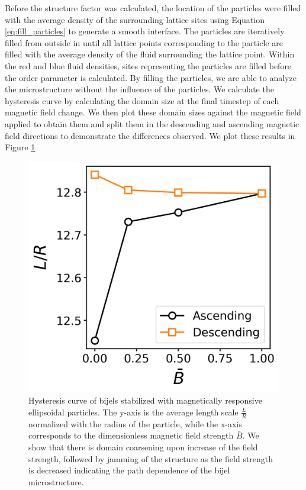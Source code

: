 Before the structure factor was calculated, the location of the particles were filled with the average density of the 
surrounding lattice sites using Equation \ref{eq:fill_particles} to generate a smooth interface. The particles are 
iteratively filled from outside in until all lattice points corresponding to the particle are filled with the average 
density of the fluid surrounding the lattice point. Within the red and blue fluid densities, sites representing the 
particles are filled before the order parameter is calculated. By filling the particles, we are able to analyze the 
microstructure without the influence of the particles. We calculate the hysteresis curve by calculating the domain 
size at the final timestep of each magnetic field change. We then plot these domain sizes against the magnetic field 
applied to obtain them and split them in the descending and ascending magnetic field directions to demonstrate the 
differences observed. We plot these results in Figure \ref{fig:hysteresis_curve}

\begin{figure} 
    \centering 
    \includegraphics[scale=0.7]{../figures/results/paper2/hysteresis_curve.png} 
    \caption{Hysteresis curve of bijels stabilized with magnetically responsive ellipsoidal particles. The y-axis is the average length scale $\frac{L}{R}$ normalized with the radius of the particle, while the x-axis corresponds to the dimensionless magnetic field strength $\bar{B}$. We show that there is domain coarsening upon increase of the field strength, followed by jamming of the structure as the field strength is decreased indicating the path dependence of the bijel microstructure.} 
    \label{fig:hysteresis_curve} 
\end{figure}


